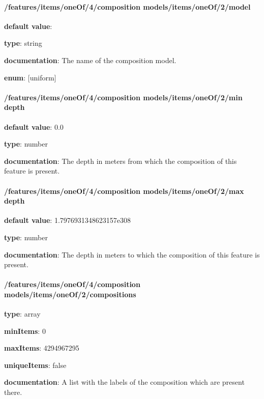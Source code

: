 \paragraph{/features/items/oneOf/4/composition models/items/oneOf/2/model} \begin{itemized}
\item {\bf default value}: 
\item {\bf type}: string
\item {\bf documentation}: The name of the composition model.
\item {\bf enum}: [uniform]\end{itemized}\paragraph{/features/items/oneOf/4/composition models/items/oneOf/2/min depth} \begin{itemized}
\item {\bf default value}: 0.0
\item {\bf type}: number
\item {\bf documentation}: The depth in meters from which the composition of this feature is present.
\end{itemized}\paragraph{/features/items/oneOf/4/composition models/items/oneOf/2/max depth} \begin{itemized}
\item {\bf default value}: 1.7976931348623157e308
\item {\bf type}: number
\item {\bf documentation}: The depth in meters to which the composition of this feature is present.
\end{itemized}\paragraph{/features/items/oneOf/4/composition models/items/oneOf/2/compositions} \begin{itemized}
\item {\bf type}: array
\item {\bf minItems}: 0
\item {\bf maxItems}: 4294967295
\item {\bf uniqueItems}: false
\item {\bf documentation}: A list with the labels of the composition which are present there.

\end{itemized}
